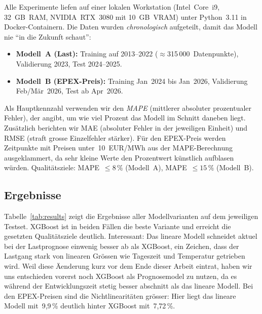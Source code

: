 \documentclass[sigconf]{acmart}
\begin{document}
Alle Experimente liefen auf einer lokalen Workstation
(Intel~Core~i9, 32~GB~RAM, NVIDIA~RTX~3080 mit 10~GB~VRAM) unter
Python~3.11 in Docker-Containern.
Die Daten wurden \emph{chronologisch} aufgeteilt, damit das Modell nie
``in die Zukunft schaut'':
\begin{itemize}
  \item \textbf{Modell~A (Last):} Training auf 2013--2022
        ($\approx$315\,000~Datenpunkte), Validierung 2023,
        Test 2024--2025.
  \item \textbf{Modell~B (EPEX-Preis):} Training Jan~2024 bis Jan~2026,
        Validierung Feb/M\"ar~2026, Test ab Apr~2026.
\end{itemize}

Als Hauptkennzahl verwenden wir den \emph{MAPE} (mittlerer absoluter
prozentualer Fehler), der angibt, um wie viel Prozent das Modell
im Schnitt daneben liegt.
Zus\"atzlich berichten wir MAE (absoluter Fehler in der
jeweiligen Einheit) und RMSE (straft grosse Einzelfehler st\"arker).
F\"ur den EPEX-Preis werden Zeitpunkte mit Preisen unter~10~EUR/MWh
aus der MAPE-Berechnung ausgeklammert, da sehr kleine Werte den
Prozentwert k\"unstlich aufblasen w\"urden.
Qualit\"atsziele: MAPE~$\leq 8\,\%$ (Modell~A),
MAPE~$\leq 15\,\%$ (Modell~B).

\subsection{Ergebnisse}

Tabelle~\ref{tab:results} zeigt die Ergebnisse aller Modellvarianten
auf dem jeweiligen Testset.
XGBoost ist in beiden F\"allen die beste Variante und erreicht die
gesetzten Qualit\"atsziele deutlich.
Interessant: Das lineare Modell schneidet aktuel bei der Lastprognose einwenig
besser ab als XGBoost, ein Zeichen, dass der Lastgang stark von
linearen Gr\"ossen wie Tageszeit und Temperatur getrieben wird. 
Weil diese \"Aenderung kurz vor dem Ende dieser Arbeit eintrat, 
haben wir uns entschieden vorerst noch XGBoost als Prognosemodel 
zu nutzen, da es w\"ahrend der Entwicklungszeit stetig besser abschnitt als das lineare Modell.
Bei den EPEX-Preisen sind die Nicht\-linear\-it\"aten gr\"osser:
Hier liegt das lineare Modell mit~9{,}9\,\% deutlich hinter XGBoost
mit~7{,}72\,\%.
\end{document}
